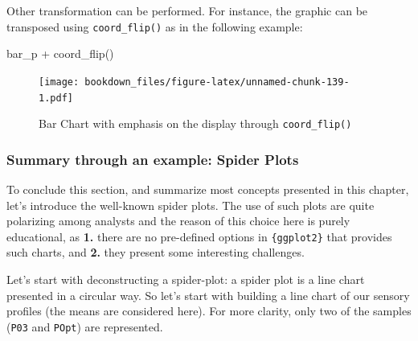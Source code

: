 \documentclass[
]{krantz}
\makeatletter
\newenvironment{Shaded}{\begin{snugshade}}{\end{snugshade}}
\newcommand{\FunctionTok}[1]{\textcolor[rgb]{0,0,0}{#1}}
\newcommand{\NormalTok}[1]{#1}
\newcommand{\SpecialCharTok}[1]{\textcolor[rgb]{0,0,0}{#1}}
\newenvironment{kframe}{%
\medskip{}
\setlength{\fboxsep}{.8em}
 \def\at@end@of@kframe{}%
 \ifinner\ifhmode%
  \def\at@end@of@kframe{\end{minipage}}%
  \begin{minipage}{\columnwidth}%
 \fi\fi%
 \def\FrameCommand##1{\hskip\@totalleftmargin \hskip-\fboxsep
 \colorbox{shadecolor}{##1}\hskip-\fboxsep
     \hskip-\linewidth \hskip-\@totalleftmargin \hskip\columnwidth}%
 \MakeFramed {\advance\hsize-\width
   \@totalleftmargin\z@ \linewidth\hsize
   \@setminipage}}%
 {\par\unskip\endMakeFramed%
 \at@end@of@kframe}
\renewenvironment{Shaded}{\begin{kframe}}{\end{kframe}}
\makeatother
\begin{document}
Other transformation can be performed. For instance, the graphic can be transposed using \texttt{coord\_flip()} as in the following example:

\begin{Shaded}
\begin{Highlighting}[]
\NormalTok{bar\_p }\SpecialCharTok{+} \FunctionTok{coord\_flip}\NormalTok{()}
\end{Highlighting}
\end{Shaded}

\begin{figure}
\centering
\texttt{[image: bookdown\_files/figure-latex/unnamed-chunk-139-1.pdf]}
\caption{\label{fig:unnamed-chunk-139}Bar Chart with emphasis on the display through \texttt{coord\_flip()}}
\end{figure}

\hypertarget{spider}{%
\subsubsection*{Summary through an example: Spider Plots}\label{spider}}


To conclude this section, and summarize most concepts presented in this chapter, let's introduce the well-known spider plots. The use of such plots are quite polarizing among analysts and the reason of this choice here is purely educational, as \textbf{1.} there are no pre-defined options in \texttt{\{ggplot2\}} that provides such charts, and \textbf{2.} they present some interesting challenges.

Let's start with deconstructing a spider-plot: a spider plot is a line chart presented in a circular way. So let's start with building a line chart of our sensory profiles (the means are considered here). For more clarity, only two of the samples (\texttt{P03} and \texttt{POpt}) are represented.
\end{document}
